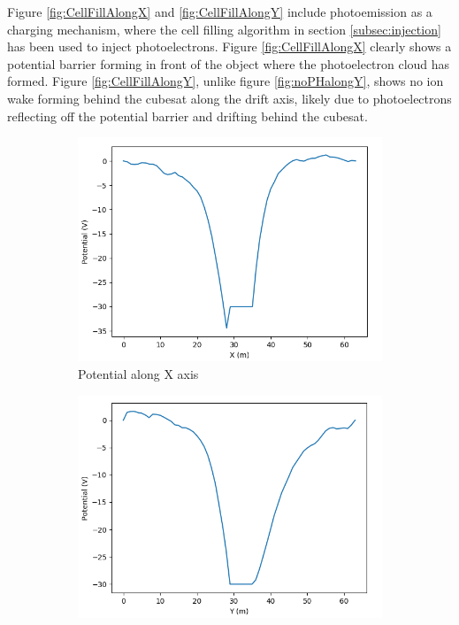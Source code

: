 Figure \ref{fig:CellFillAlongX} and \ref{fig:CellFillAlongY} include photoemission as a charging mechanism, where the cell filling algorithm in section \cref{subsec:injection} has been used to inject photoelectrons. Figure \ref{fig:CellFillAlongX} clearly shows a potential barrier forming in front of the object where the photoelectron cloud has formed. Figure \ref{fig:CellFillAlongY}, unlike figure \ref{fig:noPHalongY}, shows no ion wake forming behind the cubesat along the drift axis, likely due to photoelectrons reflecting off the potential barrier and drifting behind the cubesat.  

\begin{figure}[H]
  \begin{subfigure}[b]{0.6\textwidth}
    \includegraphics[width=\textwidth]{figures/DECA/PhotoelectronInjectionByRotationMatrix/potentialAlongX.PNG}
    \caption{Potential along X axis}
    \label{fig:RotMatAlongX}
  \end{subfigure}
  \begin{subfigure}[b]{0.6\textwidth}
    \includegraphics[width=\textwidth]{figures/DECA/PhotoelectronInjectionByRotationMatrix/potentialAlongY.PNG}

\end{subfigure}
\end{figure}
